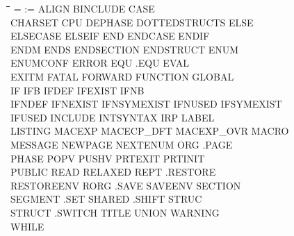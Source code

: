 {\tt\begin{tabbing}
\hspace{3cm}\=\hspace{3cm}\=\hspace{3cm}\=\hspace{3cm}\=\kill
=           \> :=          \> ALIGN       \> BINCLUDE    \> CASE \\
CHARSET     \> CPU         \> DEPHASE     \> DOTTEDSTRUCTS\> ELSE \\
ELSECASE    \> ELSEIF      \> END         \> ENDCASE     \> ENDIF \\
ENDM        \> ENDS        \> ENDSECTION  \> ENDSTRUCT   \> ENUM \\
ENUMCONF    \> ERROR       \> EQU         \> .EQU        \> EVAL \\
EXITM       \> FATAL       \> FORWARD     \> FUNCTION    \> GLOBAL \\
IF          \> IFB         \> IFDEF       \> IFEXIST     \> IFNB \\
IFNDEF      \> IFNEXIST    \> IFNSYMEXIST \> IFNUSED     \> IFSYMEXIST \\
IFUSED      \> INCLUDE     \> INTSYNTAX   \> IRP         \> LABEL \\
LISTING     \> MACEXP      \> MACECP\_DFT \> MACEXP\_OVR \> MACRO \\
MESSAGE     \> NEWPAGE     \> NEXTENUM    \> ORG         \> .PAGE \\
PHASE       \> POPV        \> PUSHV       \> PRTEXIT     \> PRTINIT \\
PUBLIC      \> READ        \> RELAXED     \> REPT        \> .RESTORE \\
RESTOREENV  \> RORG        \> .SAVE       \> SAVEENV     \> SECTION \\
SEGMENT     \> .SET        \> SHARED      \> .SHIFT      \> STRUC \\
STRUCT      \> .SWITCH     \> TITLE       \> UNION       \> WARNING \\
WHILE \\
\end{tabbing}}
